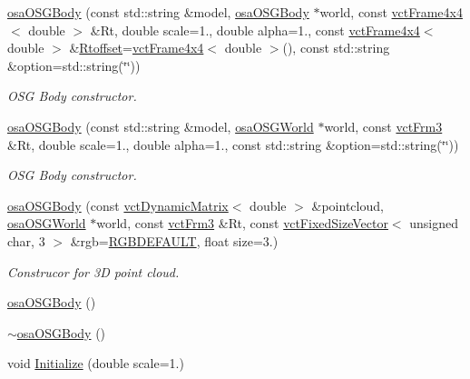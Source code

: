 \begin{DoxyCompactItemize}
\hyperlink{classosa_o_s_g_body_a16b475d99049179329a5f8ab7de26f94}{osa\+O\+S\+G\+Body} (const std\+::string \&model, \hyperlink{classosa_o_s_g_body}{osa\+O\+S\+G\+Body} $\ast$world, const \hyperlink{classvct_frame4x4}{vct\+Frame4x4}$<$ double $>$ \&Rt, double scale=1., double alpha=1., const \hyperlink{classvct_frame4x4}{vct\+Frame4x4}$<$ double $>$ \&\hyperlink{classosa_o_s_g_body_ad008984bdb0eda300948932eda13974a}{Rtoffset}=\hyperlink{classvct_frame4x4}{vct\+Frame4x4}$<$ double $>$(), const std\+::string \&option=std\+::string(\char`\"{}\char`\"{}))
\begin{DoxyCompactList}\small\item\em O\+S\+G Body constructor. \end{DoxyCompactList}\item 
\hyperlink{classosa_o_s_g_body_ad54afa91618639e95aad76b1b102a05f}{osa\+O\+S\+G\+Body} (const std\+::string \&model, \hyperlink{classosa_o_s_g_world}{osa\+O\+S\+G\+World} $\ast$world, const \hyperlink{vct_transformation_types_8h_a81feda0a02c2d1bc26e5553f409fed20}{vct\+Frm3} \&Rt, double scale=1., double alpha=1., const std\+::string \&option=std\+::string(\char`\"{}\char`\"{}))
\begin{DoxyCompactList}\small\item\em O\+S\+G Body constructor. \end{DoxyCompactList}\item 
\hyperlink{classosa_o_s_g_body_ad32c2836c65eaa78a179d22e39c2f759}{osa\+O\+S\+G\+Body} (const \hyperlink{classvct_dynamic_matrix}{vct\+Dynamic\+Matrix}$<$ double $>$ \&pointcloud, \hyperlink{classosa_o_s_g_world}{osa\+O\+S\+G\+World} $\ast$world, const \hyperlink{vct_transformation_types_8h_a81feda0a02c2d1bc26e5553f409fed20}{vct\+Frm3} \&Rt, const \hyperlink{classvct_fixed_size_vector}{vct\+Fixed\+Size\+Vector}$<$ unsigned char, 3 $>$ \&rgb=\hyperlink{classosa_o_s_g_body_a1fb439b90b8d0277e28240e35de006dd}{R\+G\+B\+D\+E\+F\+A\+U\+L\+T}, float size=3.)
\begin{DoxyCompactList}\small\item\em Construcor for 3\+D point cloud. \end{DoxyCompactList}\item 
\hyperlink{classosa_o_s_g_body_abf7933075da8ad26543fd13e82a1e1e2}{osa\+O\+S\+G\+Body} ()
\item 
\hyperlink{classosa_o_s_g_body_a07282fd85d9ea4e9ce8daf765b861b74}{$\sim$osa\+O\+S\+G\+Body} ()
\item 
void \hyperlink{classosa_o_s_g_body_a861b3d8a0ce96c9aacd6c3da33c5a415}{Initialize} (double scale=1.)

\end{DoxyCompactItemize}
